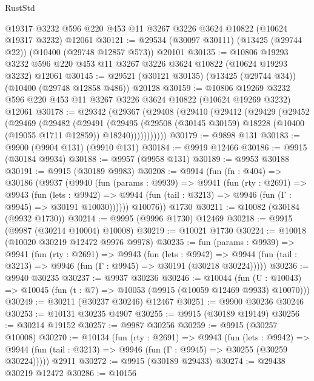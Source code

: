 \begin{lexlean}{RustStd}
\begin{coremodule}
{\begin{coremodule}
{{{{{{{{{{{{{{{{{{{{{{{{{    @19317
    @3232
    @596
    @220
    @453
    @11
    @3267
    @3226
    @3624
    @10822
    (@10624 @19317 @3232)
    @12061
@30121 := @29534 (@30097 @30111) (@13425 (@29744 @22)) (@10400 (@29748 @12857 @573)) @20101
@30135 := @10806
    @19293
    @3232
    @596
    @220
    @453
    @11
    @3267
    @3226
    @3624
    @10822
    (@10624 @19293 @3232)
    @12061
@30145 := @29521 (@30121 @30135) (@13425 (@29744 @34)) (@10400 (@29748 @12858 @486)) @20128
@30159 := @10806
    @19269
    @3232
    @596
    @220
    @453
    @11
    @3267
    @3226
    @3624
    @10822
    (@10624 @19269 @3232)
    @12061
@30178 := @29342
    (@29367
      (@29408
        (@29410
          (@29412
            (@29429
              (@29452
                (@29469
                  (@29482
                    (@29491
                      (@29495
                        (@29508
                          (@30145 @30159)
                          @18228
                          (@10400 (@19055 @1711 @12859))
                          @18240)))))))))))
@30179 := @9898 @131
@30183 := @9900 (@9904 @131) (@9910 @131)
@30184 := @9919 @12466
@30186 := @9915 (@30184 @9934)
@30188 := @9957 (@9958 @131)
@30189 := @9953 @30188
@30191 := @9915 (@30189 @9983)
@30208 := @9914
    (fun (fn : @404) =>
    @30186
      (@9937
        (@9940
          (fun (params : @9939) =>
          @9941
            (fun (rty : @2691) =>
            @9943
              (fun (lets : @9942) =>
              @9944 (fun (tail : @3213) => @9946 (fun (Γ : @9945) => @30191 @10030))))))
        @10076))
    @1730
@30211 := @10082 (@30184 (@9932 @1730))
@30214 := @9995 (@9996 @1730) @12469
@30218 := @9915 (@9987 (@30214 @10004) @10008)
@30219 := @10021 @1730
@30224 := @10018 (@10020 @30219 @12472 @9976 @9978)
@30235 := fun (params : @9939) =>
  @9941
    (fun (rty : @2691) =>
    @9943
      (fun (lets : @9942) =>
      @9944 (fun (tail : @3213) => @9946 (fun (Γ : @9945) => @30191 (@30218 @30224)))))
@30236 := @9940 @30235
@30237 := @9937 @30236
@30246 := @10044
    (fun (U : @10043) => @10045 (fun (t : @7) => @10053 (@9915 (@10059 @12469 @9933) @10070)))
@30249 := @30211 (@30237 @30246) @12467
@30251 := @9900 @30236 @30246
@30253 := @10131 @30235 @4907
@30255 := @9915 (@30189 @19149)
@30256 := @30214 @19152
@30257 := @9987 @30256
@30259 := @9915 (@30257 @10008)
@30270 := @10134
    (fun (rty : @2691) =>
    @9943
      (fun (lets : @9942) =>
      @9944 (fun (tail : @3213) => @9946 (fun (Γ : @9945) => @30255 (@30259 @30224)))))
    @2911
@30272 := @9915 (@30189 @29433)
@30274 := @29438 @30219 @12472
@30286 := @10156
}}}}}}}}}}}}}}}}}}}}}}}}}
\end{coremodule}}
\end{coremodule}
\end{lexlean}
